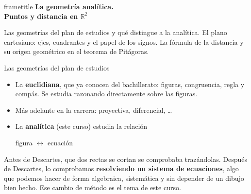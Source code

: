 \documentclass[aspectratio=169,10pt]{beamer}
\newcommand{\destaca}[1]{%
  \par\vspace{3pt}\noindent
  \colorbox{turquesaClaro}{%
    \parbox{\dimexpr\linewidth-2\fboxsep\relax}{\vspace{3pt}#1\vspace{3pt}}}%
  \par\vspace{3pt}}
\newcommand{\hojaSesion}[2]{%
  \vfill
  \begin{beamercolorbox}[wd=\textwidth,sep=16pt,center]{frametitle}
    {\Large\bfseries #1}\\[11pt]
    \begin{minipage}{0.82\textwidth}\centering\small #2\end{minipage}
  \end{beamercolorbox}
  \vfill}
\begin{document}
\begin{frame}[plain]
  \hojaSesion{La geometría analítica.\\ Puntos y distancia en $\mathbb{R}^2$}{%
  Las geometrías del plan de estudios y qué distingue a la analítica.
  El plano cartesiano: ejes, cuadrantes y el papel de los signos.
  La fórmula de la distancia y su origen geométrico en el teorema de
  Pitágoras.}
\end{frame}
\begin{frame}{Las geometrías del plan de estudios}
  \begin{itemize}
    \item La \textbf{euclidiana}, que ya conocen del bachillerato:
      figuras, congruencia, regla y compás. Se estudia razonando
      directamente sobre las figuras.

      \vspace{0.2cm}
    \item Más adelante en la carrera: proyectiva, diferencial, \dots

      \vspace{0.2cm}
    \item La \textbf{analítica} (este curso) estudia la relación

      \vspace{2mm}
      \begin{center}
        {\Large\color{turquesaGA} figura $\longleftrightarrow$ ecuación}
      \end{center}
  \end{itemize}
  
  \vspace{0.4cm}
  \destaca{Antes de Descartes, que dos rectas se cortan se comprobaba
  trazándolas. Después de Descartes, lo comprobamos \textbf{resolviendo
  un sistema de ecuaciones}, algo que podemos hacer de forma algebraica,
  sistemática y sin depender de un dibujo bien hecho. Ese cambio de
  método es el tema de este curso.}
\end{frame}
\end{document}
